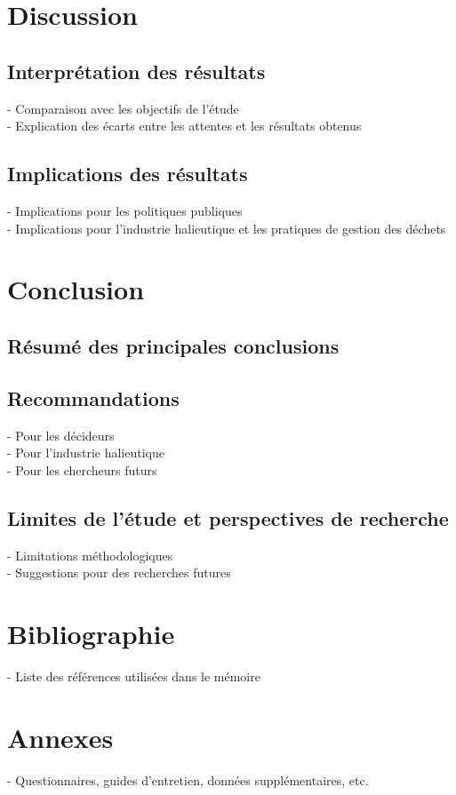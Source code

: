 \documentclass[12pt,a4paper]{report}
\begin{document}
\chapter{Discussion}
\section{Interprétation des résultats}
- Comparaison avec les objectifs de l'étude\\
- Explication des écarts entre les attentes et les résultats obtenus

\section{Implications des résultats}
- Implications pour les politiques publiques\\
- Implications pour l'industrie halieutique et les pratiques de gestion des déchets

\chapter*{Conclusion}
\section*{Résumé des principales conclusions}
\section*{Recommandations}
- Pour les décideurs\\
- Pour l'industrie halieutique\\
- Pour les chercheurs futurs

\section*{Limites de l'étude et perspectives de recherche}
- Limitations méthodologiques\\
- Suggestions pour des recherches futures

\chapter*{Bibliographie}
- Liste des références utilisées dans le mémoire

\appendix
\chapter{Annexes}
- Questionnaires, guides d'entretien, données supplémentaires, etc.
\end{document}
